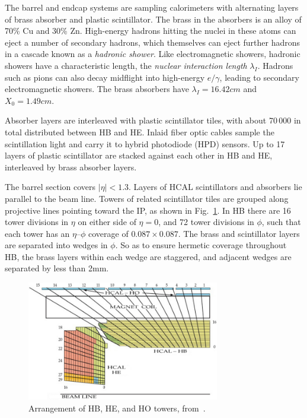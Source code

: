 \documentclass[oneside, letterpaper, 12pt, oldfontcommands]{memoir}
\begin{document}
The barrel and endcap systems are sampling calorimeters with alternating layers of brass absorber and plastic scintillator.
The brass in the absorbers is an alloy of 70\% Cu and 30\% Zn. High-energy hadrons hitting the nuclei in these atoms can eject
a number of secondary hadrons, which themselves can eject further hadrons in a cascade known as a \textit{hadronic shower}.
Like electromagnetic showers, hadronic showers have a characteristic length, the \textit{nuclear interaction length} $\lambda_{I}$.
Hadrons such as pions can also decay midflight into high-energy $e/\gamma$, leading to secondary electromagnetic showers.
The brass absorbers have $\lambda_{I} = 16.42\unit{cm}$ and $X_{0} = 1.49\unit{cm}$.

Absorber layers are interleaved with plastic scintillator tiles, with about 70\,000 in total distributed between HB and HE.
Inlaid fiber optic cables sample the scintillation light and carry it to hybrid photodiode (HPD) sensors. Up to 17 layers of
plastic scintillator are stacked against each other in HB and HE, interleaved by brass absorber layers.

The barrel section covers $|\eta| < 1.3$.
Layers of HCAL scintillators and absorbers lie parallel to the beam line. Towers of related scintillator tiles are grouped along
projective lines pointing toward the IP, as shown in Fig.~\ref{fig:hcal_towers}.
In HB there are 16 tower divisions in $\eta$ on either side of $\eta = 0$, and 72 tower divisions in $\phi$, such that each tower
has an $\eta$--$\phi$ coverage of $0.087{\times}0.087$. The brass and scintillator layers are separated into wedges in $\phi$.
So as to ensure hermetic coverage throughout HB, the brass layers within each wedge are staggered, and adjacent wedges are separated by less than 2\unit{mm}.

\begin{figure}[hbtp]
  \begin{center}
    \includegraphics[width=0.75\textwidth]{Figures/hcal_towers.png}
    \caption{
    Arrangement of HB, HE, and HO towers, from~\cite{ref:1748-0221/3/08/S08004}.
    }
    \label{fig:hcal_towers}
  \end{center}
\end{figure}
\end{document}
